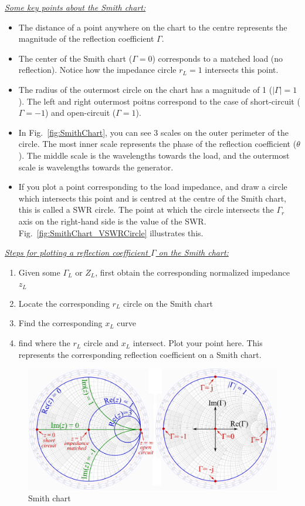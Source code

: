 \underline{\textit{Some key points about the Smith chart:
}}
\begin{itemize}
    \item The distance of a point anywhere on the chart to the centre represents the magnitude of the reflection coefficient $\Gamma$. 
    \item The center of the Smith chart ($\Gamma = 0$) corresponds to a matched load (no reflection). Notice how the impedance circle $r_L = 1$ intersects this point. 
    \item The radius of the outermost circle on the chart has a magnitude of 1 ($|\Gamma|=1$). The left and right outermost poitns correspond to the case of short-circuit ($\Gamma=-1$) and open-circuit ($\Gamma=1$). 
    \item In Fig.\ \ref{fig:SmithChart}, you can see 3 scales on the outer perimeter of the circle. The most inner scale represents the phase of the reflection coefficient ($\theta$). The middle scale is the wavelengths towards the load, and the outermost scale is wavelengths towards the generator. 
    \item If you plot a point corresponding to the load impedance, and draw a circle which intersects this point and is centred at the centre of the Smith chart, this is called a SWR circle. The point at which the circle intersects the $\Gamma_r$ axis on the right-hand side is the value of the SWR. Fig.\ \ref{fig:SmithChart_VSWRCircle} illustrates this.
    
\end{itemize}

\underline{\textit{Steps for plotting a reflection coefficient $\Gamma$ on the Smith chart:}}
\begin{enumerate}
    \item Given some $\Gamma_L$ or $Z_L$, first obtain the corresponding normalized impedance $z_L$
    \item Locate the corresponding $r_L$ circle on the Smith chart 
    \item Find the corresponding $x_L$ curve
    \item 
    find where the $r_L$ circle and $x_L$ intersect. Plot your point here. This represents the corresponding reflection coefficient on a Smith chart. 
\end{enumerate}

\begin{figure}[!htp]
    \centering
    \includegraphics[width=\linewidth]{images/Transmission Line Theory/SmithChart2.png}
    \caption{Smith chart}
    \label{fig:SmithChart2}
\end{figure}

